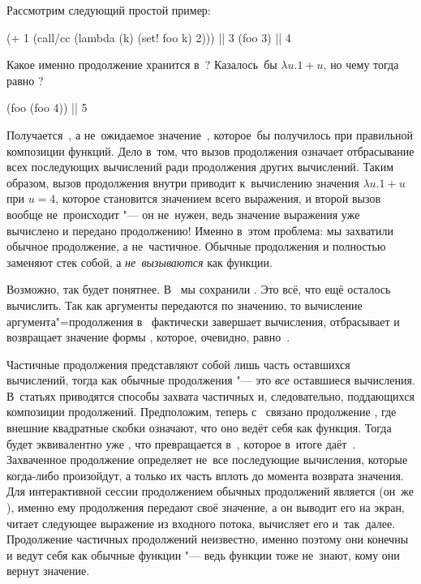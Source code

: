 Рассмотрим следующий простой пример:

\begin{code:lisp}
(+ 1 (call/cc (lambda (k) (set! foo k) 2))) |\is| 3
(foo 3)                                     |\is| 4
\end{code:lisp}

\noindent
Какое именно продолжение хранится в~? Казалось~бы $\lambda u . 1 + u$,
но чему тогда равно ?

\begin{code:lisp}
(foo (foo 4))                               |\is| 5
\end{code:lisp}

Получается~, а не~ожидаемое значение~, которое~бы получилось при
правильной композиции функций. Дело в~том, что вызов продолжения означает
отбрасывание всех последующих вычислений ради продолжения других вычислений.
Таким образом, вызов продолжения внутри  приводит к~вычислению значения
$\lambda u. 1 + u$ при $u = 4$, которое становится значением всего выражения, и
второй вызов  вообще не~происходит "--- он не~нужен, ведь значение
выражения уже вычислено и передано продолжению! Именно в~этом проблема: мы
захватили обычное продолжение, а не~частичное. Обычные продолжения
 и полностью заменяют стек собой, а \emph{не~вызываются}
как функции.

Возможно, так будет понятнее. В~ мы сохранили . Это всё,
что ещё осталось вычислить. Так как аргументы передаются по значению, то
вычисление аргумента"=продолжения в~ фактически завершает
вычисления, отбрасывает  и возвращает значение формы ,
которое, очевидно, равно~.

Частичные продолжения представляют собой лишь часть оставшихся вычислений, тогда
как обычные продолжения "--- это \emph{все} оставшиеся вычисления.
В~статьях \cite{fwfd88,df90,hd90,qs91} приводятся способы захвата частичных и,
следовательно, поддающихся композиции продолжений. Предположим, теперь
с~ связано продолжение \ic{[(+~1~[])]}, где внешние квадратные скобки
означают, что оно ведёт себя как функция. Тогда  будет
эквивалентно уже , что превращается в~,
которое в~итоге даёт~. Захваченное продолжение \ic{[(+~1~[])]} определяет
не~все последующие вычисления, которые когда-либо произойдут, а только их часть
вплоть до момента возврата значения. Для интерактивной сессии продолжением
обычных продолжений является  (он~же ), именно
ему продолжения передают своё значение, а он выводит его на экран, читает
следующее выражение из входного потока, вычисляет его и~так~далее. Продолжение
частичных продолжений неизвестно, именно поэтому они конечны и ведут себя как
обычные функции "--- ведь функции тоже не~знают, кому они вернут значение.

